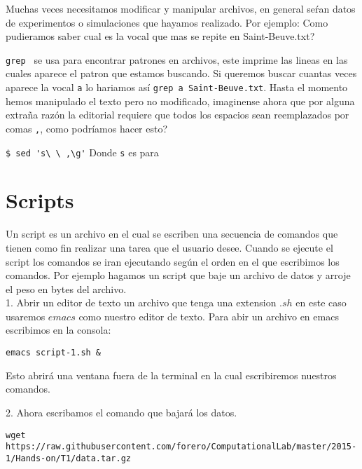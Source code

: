 \documentclass[12pt]{article}
\begin{document}
Muchas veces necesitamos modificar y manipular archivos, en general se\'ran datos de experimentos o simulaciones que hayamos realizado.
Por ejemplo: Como pudieramos saber cual es la vocal que mas se repite en Saint-Beuve.txt? 


\verb+grep + se usa para encontrar patrones en archivos, este imprime las lineas en las cuales aparece el patron que estamos buscando.
Si queremos buscar cuantas veces aparece la vocal \verb+a+ lo hariamos as\'i \verb+grep a Saint-Beuve.txt+. Hasta el momento hemos manipulado 
el texto pero no modificado, imaginense ahora que por alguna extra\~na raz\'on la editorial requiere que todos los espacios sean reemplazados 
por comas \verb+,+, como podr\'iamos hacer esto?  


\verb+$ sed 's\ \ ,\g'+ Donde \verb+s+ es para 


\verb++



\section{Scripts}

Un script es un archivo en el cual se escriben una secuencia de comandos
que tienen como fin realizar una tarea que el usuario desee. Cuando se ejecute 
el script los comandos se iran ejecutando seg\'un el orden en el que escribimos los comandos. Por ejemplo hagamos un script que baje un archivo de datos y arroje el peso en bytes del archivo.\\

1. Abrir un editor de texto un archivo que tenga una extension $.sh$ en este 
caso usaremos $emacs$ como nuestro editor de texto. Para abir un archivo en emacs escribimos en la consola:\\
\begin{verbatim}
emacs script-1.sh &
\end{verbatim}
Esto abrir\'a una ventana fuera de la terminal en la cual escribiremos nuestros comandos.

2. Ahora escribamos el comando que bajar\'a los datos.

\begin{verbatim}
wget https://raw.githubusercontent.com/forero/ComputationalLab/master/2015-1/Hands-on/T1/data.tar.gz
\end{verbatim}
\end{document}
